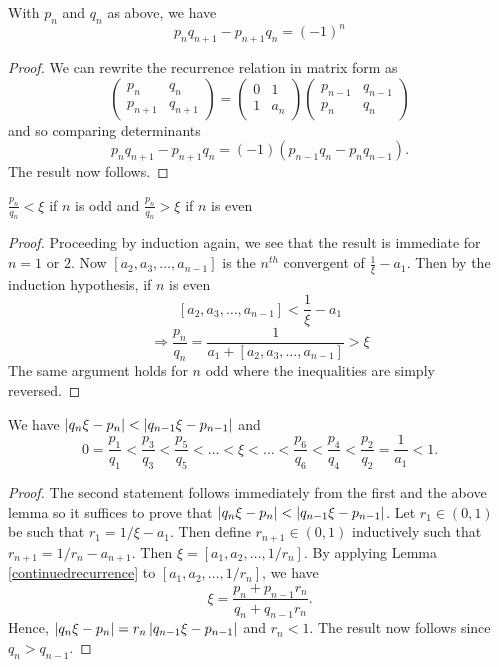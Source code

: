 \begin{cor}
With $p_{n}$ and $q_{n}$ as above, we have 
$$p_{n}q_{n+1} - p_{n+1}q_{n} = (-1)^{n}$$
\end{cor}
\begin{proof}
We can rewrite the recurrence relation in matrix form as
\[
\begin{pmatrix}
p_{n} & q_{n}\\
p_{n+1} & q_{n+1}
\end{pmatrix}
= 
\begin{pmatrix}
0 & 1\\
1 & a_{n}
\end{pmatrix}
\begin{pmatrix}
p_{n-1} & q_{n-1}\\
p_{n} & q_{n}
\end{pmatrix}
\]
and so comparing determinants
\[
p_{n}q_{n+1} - p_{n+1}q_{n} = (-1)(p_{n-1}q_{n} - p_{n}q_{n-1}).
\]
The result now follows.
\end{proof}

\begin{lem}
$\frac{p_{n}}{q_{n}} < \xi$ if $n$ is odd and $\frac{p_{n}}{q_{n}} > \xi$ if $n$ is even
\end{lem}
\begin{proof}
Proceeding by induction again, we see that the result is immediate for $n = 1$ or $2$. Now $[a_2, a_3, \dots, a_{n-1}]$ is the $n^{th}$ convergent of $\frac{1}{\xi} - a_1$. Then by the induction hypothesis, if $n$ is even
\[
[a_2, a_3, \dots, a_{n-1}] < \frac{1}{\xi} - a_1
\]
\[
\Rightarrow \frac{p_{n}}{q_{n}} = \frac{1}{a_1 + [a_2, a_3, \dots, a_{n-1}]} > \xi
\]
The same argument holds for $n$ odd where the inequalities are simply reversed.
\end{proof}

\begin{cor}
We have $\left|q_{n}\xi - p_{n}\right| < \left|q_{n-1}\xi - p_{n-1}\right|$ and
\[
0 = \frac{p_1}{q_1} < \frac{p_3}{q_3} < \frac{p_5}{q_5} < \dots < \xi < \dots < \frac{p_6}{q_6} < \frac{p_4}{q_4} < \frac{p_2}{q_2} = \frac{1}{a_1} < 1.
\]
\end{cor}
\begin{proof}
The second statement follows immediately from the first and the above lemma so it suffices to prove that $\left|q_{n}\xi - p_{n}\right| < \left|q_{n-1}\xi - p_{n-1}\right|$.
Let $r_{1} \in (0, 1)$ be such that $r_{1} = 1/\xi - a_{1}$. Then define $r_{n+1} \in (0,1)$ inductively such that $r_{n+1} = 1/r_{n} - a_{n+1}$. Then $\xi = \left[a_1, a_2, \dots, 1/r_{n}\right]$. By applying Lemma \ref{continuedrecurrence} to $\left[a_1, a_2, \dots, 1/r_{n}\right]$, we have
\[
\xi = \frac{p_{n} + p_{n-1}r_{n}}{q_{n} + q_{n-1}r_{n}}.
\]
Hence, $\left|q_{n}\xi - p_{n}\right| = r_{n}\left|q_{n-1}\xi - p_{n-1}\right|$ and $r_{n} < 1$. The result now follows since $q_{n} > q_{n-1}$.
\end{proof}



















